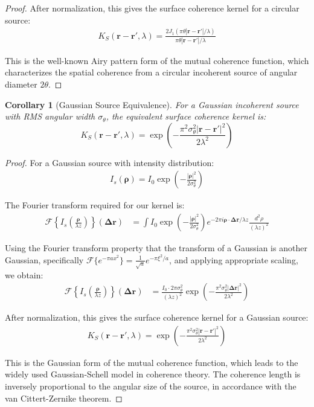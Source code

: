 \documentclass[a4paper,12pt]{article}
\newtheorem{corollary}[theorem]{Corollary}
\begin{document}
\begin{proof}
After normalization, this gives the surface coherence kernel for a circular source:
\begin{align}
K_S(\bm{r} - \bm{r}', \lambda) = \frac{2J_1(\pi\theta|\bm{r} - \bm{r}'|/\lambda)}{\pi\theta|\bm{r} - \bm{r}'|/\lambda}
\end{align}

This is the well-known Airy pattern form of the mutual coherence function, which characterizes the spatial coherence from a circular incoherent source of angular diameter $2\theta$.
\end{proof}

\begin{corollary}[Gaussian Source Equivalence]
For a Gaussian incoherent source with RMS angular width $\sigma_\theta$, the equivalent surface coherence kernel is:
\begin{equation}
K_S(\bm{r} - \bm{r}', \lambda) = \exp\left(-\frac{\pi^2\sigma_\theta^2|\bm{r} - \bm{r}'|^2}{2\lambda^2}\right)
\end{equation}
\end{corollary}

\begin{proof}
For a Gaussian source with intensity distribution:
\begin{align}
I_s(\bm{\rho}) = I_0 \exp\left(-\frac{|\bm{\rho}|^2}{2\sigma_\theta^2}\right)
\end{align}

The Fourier transform required for our kernel is:
\begin{align}
\mathcal{F}\left\{I_s\left(\frac{\bm{\rho}}{\lambda z}\right)\right\}(\bm{\Delta r}) &= \int I_0 \exp\left(-\frac{|\bm{\rho}|^2}{2\sigma_\theta^2}\right) e^{-2\pi i \bm{\rho} \cdot \bm{\Delta r}/\lambda z} \frac{d^2\rho}{(\lambda z)^2}
\end{align}

Using the Fourier transform property that the transform of a Gaussian is another Gaussian, specifically $\mathcal{F}\{e^{-\pi a x^2}\} = \frac{1}{\sqrt{a}}e^{-\pi \xi^2/a}$, and applying appropriate scaling, we obtain:
\begin{align}
\mathcal{F}\left\{I_s\left(\frac{\bm{\rho}}{\lambda z}\right)\right\}(\bm{\Delta r}) &= \frac{I_0 \cdot 2\pi\sigma_\theta^2}{(\lambda z)^2} \exp\left(-\frac{\pi^2\sigma_\theta^2|\bm{\Delta r}|^2}{2\lambda^2}\right)
\end{align}

After normalization, this gives the surface coherence kernel for a Gaussian source:
\begin{align}
K_S(\bm{r} - \bm{r}', \lambda) = \exp\left(-\frac{\pi^2\sigma_\theta^2|\bm{r} - \bm{r}'|^2}{2\lambda^2}\right)
\end{align}

This is the Gaussian form of the mutual coherence function, which leads to the widely used Gaussian-Schell model in coherence theory. The coherence length is inversely proportional to the angular size of the source, in accordance with the van Cittert-Zernike theorem.
\end{proof}
\end{document}

